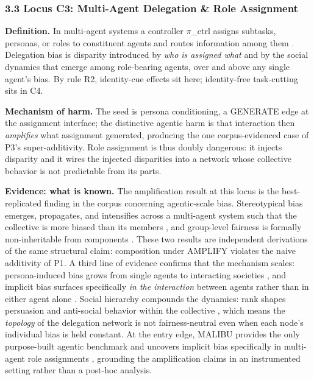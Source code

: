 \documentclass[10pt]{article}
\begin{document}
\subsubsection*{3.3 Locus C3: Multi-Agent Delegation \& Role Assignment}

\textbf{Definition.} In multi-agent systems a controller $\pi$\_ctrl assigns subtasks, personas, or roles to constituent agents and routes information among them \cite{wu2023autogen,guo2024large,qian2024chatdev}. Delegation bias is disparity introduced by \emph{who is assigned what} and by the social dynamics that emerge among role-bearing agents, over and above any single agent's bias. By rule R2, identity-cue effects sit here; identity-free task-cutting sits in C4.

\textbf{Mechanism of harm.} The seed is persona conditioning, a GENERATE edge at the assignment interface; the distinctive agentic harm is that interaction then \emph{amplifies} what assignment generated, producing the one corpus-evidenced case of P3's super-additivity. Role assignment is thus doubly dangerous: it injects disparity and it wires the injected disparities into a network whose collective behavior is not predictable from its parts.

\textbf{Evidence: what is known.} The amplification result at this locus is the best-replicated finding in the corpus concerning agentic-scale bias. Stereotypical bias emerges, propagates, and intensifies across a multi-agent system such that the collective is more biased than its members \cite{nguyen2025social}, and group-level fairness is formally non-inheritable from components \cite{madigan2025emergent}. These two results are independent derivations of the same structural claim: composition under AMPLIFY violates the naive additivity of P1. A third line of evidence confirms that the mechanism scales: persona-induced bias grows from single agents to interacting societies \cite{li2025from}, and implicit bias surfaces specifically \emph{in the interaction} between agents rather than in either agent alone \cite{borah2024implicit}. Social hierarchy compounds the dynamics: rank shapes persuasion and anti-social behavior within the collective \cite{campedelli2024want}, which means the \emph{topology} of the delegation network is not fairness-neutral even when each node's individual bias is held constant. At the entry edge, MALIBU provides the only purpose-built agentic benchmark and uncovers implicit bias specifically in multi-agent role assignments \cite{mirza2025malibu}, grounding the amplification claims in an instrumented setting rather than a post-hoc analysis.
\end{document}
